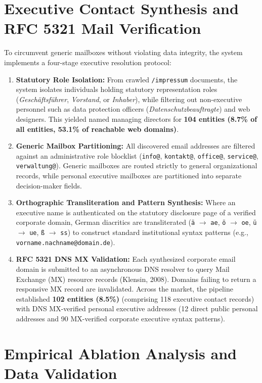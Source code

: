 \documentclass[11pt,a4paper]{article}
\begin{document}
\section{Executive Contact Synthesis and RFC 5321 Mail Verification}
To circumvent generic mailboxes without violating data integrity, the system implements a four-stage executive resolution protocol:
\begin{enumerate}
    \item \textbf{Statutory Role Isolation:} From crawled \texttt{/impressum} documents, the system isolates individuals holding statutory representation roles (\textit{Gesch\"aftsf\"uhrer}, \textit{Vorstand}, or \textit{Inhaber}), while filtering out non-executive personnel such as data protection officers (\textit{Datenschutzbeauftragte}) and web designers. This yielded named managing directors for \textbf{104 entities (8.7\% of all entities, 53.1\% of reachable web domains)}.
    \item \textbf{Generic Mailbox Partitioning:} All discovered email addresses are filtered against an administrative role blocklist (\texttt{info@}, \texttt{kontakt@}, \texttt{office@}, \texttt{service@}, \texttt{verwaltung@}). Generic mailboxes are routed strictly to general organizational records, while personal executive mailboxes are partitioned into separate decision-maker fields.
    \item \textbf{Orthographic Transliteration and Pattern Synthesis:} Where an executive name is authenticated on the statutory disclosure page of a verified corporate domain, German diacritics are transliterated (\texttt{\"a} $\to$ \texttt{ae}, \texttt{\"o} $\to$ \texttt{oe}, \texttt{\"u} $\to$ \texttt{ue}, \texttt{\ss} $\to$ \texttt{ss}) to construct standard institutional syntax patterns (e.g., \texttt{vorname.nachname@domain.de}).
    \item \textbf{RFC 5321 DNS MX Validation:} Each synthesized corporate email domain is submitted to an asynchronous DNS resolver to query Mail Exchange (MX) resource records (Klensin, 2008). Domains failing to return a responsive MX record are invalidated. Across the market, the pipeline established \textbf{102 entities (8.5\%)} (comprising 118 executive contact records) with DNS MX-verified personal executive addresses (12 direct public personal addresses and 90 MX-verified corporate executive syntax patterns).
\end{enumerate}

\section{Empirical Ablation Analysis and Data Validation}
\end{document}
